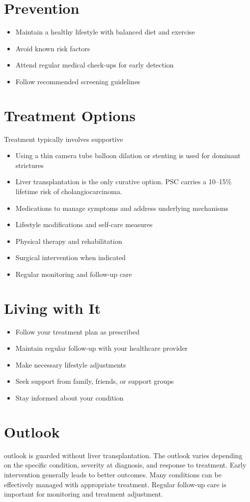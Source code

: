 \section{Prevention}
\begin{itemize}[noitemsep]
  \item Maintain a healthy lifestyle with balanced diet and exercise
  \item Avoid known risk factors
  \item Attend regular medical check-ups for early detection
  \item Follow recommended screening guidelines
\end{itemize}
\section{Treatment Options}
Treatment typically involves supportive

\begin{itemize}[noitemsep]
  \item Using a thin camera tube balloon dilation or stenting is used for dominant strictures
  \item Liver transplantation is the only curative option. PSC carries a 10--15\% lifetime risk of cholangiocarcinoma.
  \item Medications to manage symptoms and address underlying mechanisms
  \item Lifestyle modifications and self-care measures
  \item Physical therapy and rehabilitation
  \item Surgical intervention when indicated
  \item Regular monitoring and follow-up care
\end{itemize}
\section{Living with It}
\begin{itemize}[noitemsep]
  \item Follow your treatment plan as prescribed
  \item Maintain regular follow-up with your healthcare provider
  \item Make necessary lifestyle adjustments
  \item Seek support from family, friends, or support groups
  \item Stay informed about your condition
\end{itemize}
\section{Outlook}
outlook is guarded without liver transplantation. The outlook varies depending on the specific condition, severity at diagnosis, and response to treatment. Early intervention generally leads to better outcomes. Many conditions can be effectively managed with appropriate treatment. Regular follow-up care is important for monitoring and treatment adjustment.
